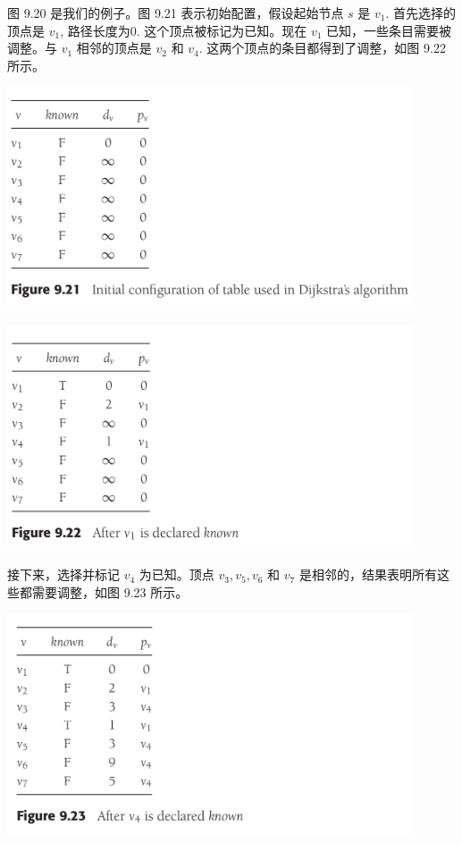 \documentclass[a4paper]{ctexart}
\theoremstyle{definition}
\theoremstyle{definition}
\begin{document}
图 9.20 是我们的例子。图 9.21 表示初始配置，假设起始节点 \( s \) 是 \( v_1 \). 首先选择的顶点是 \( v_1 \), 路径长度为$0$. 
这个顶点被标记为已知。现在 \( v_1 \) 已知，一些条目需要被调整。与 \( v_1 \) 相邻的顶点是 \( v_2 \) 和 \( v_4 \). 
这两个顶点的条目都得到了调整，如图 9.22 所示。

\begin{center}
  \includegraphics[width=0.9\textwidth]{images/FIG9_21.png}
\end{center}

\begin{center}
  \includegraphics[width=0.9\textwidth]{images/FIG9_22.png}
\end{center}

接下来，选择并标记 \( v_4 \) 为已知。顶点 \( v_3, v_5, v_6 \) 和 \( v_7 \) 是相邻的，结果表明所有这些都需要调整，如图 9.23 所示。

\begin{center}
  \includegraphics[width=0.9\textwidth]{images/FIG9_23.png}
\end{center}
\end{document}

